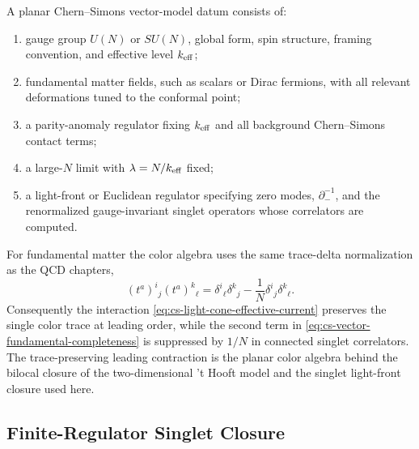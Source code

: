 \begin{definition}
\label{def:planar-cs-vector-model-datum}
A planar Chern--Simons vector-model datum consists of:
\begin{enumerate}[label=(\roman*)]
\item gauge group \(U(N)\) or \(SU(N)\), global form, spin structure, framing
  convention, and effective level \(k_{\rm eff}\);
\item fundamental matter fields, such as scalars or Dirac fermions, with all
  relevant deformations tuned to the conformal point;
\item a parity-anomaly regulator fixing \(k_{\rm eff}\) and all background
  Chern--Simons contact terms;
\item a large-\(N\) limit with \(\lambda=N/k_{\rm eff}\) fixed;
\item a light-front or Euclidean regulator specifying zero modes,
  \(\partial_-^{-1}\), and the renormalized gauge-invariant singlet
  operators whose correlators are computed.
\end{enumerate}
\end{definition}

For fundamental matter the color algebra uses the same trace-delta
normalization as the QCD chapters,
\begin{equation}
  (t^a)^i{}_j(t^a)^k{}_\ell
  =
  \delta^i{}_\ell\delta^k{}_j
  -
  \frac1N\delta^i{}_j\delta^k{}_\ell .
  \label{eq:cs-vector-fundamental-completeness}
\end{equation}
Consequently the interaction
\eqref{eq:cs-light-cone-effective-current} preserves the single color trace at
leading order, while the second term in
\eqref{eq:cs-vector-fundamental-completeness} is suppressed by \(1/N\) in
connected singlet correlators.  The trace-preserving leading contraction is the
planar color algebra behind the bilocal closure of the two-dimensional
't Hooft model and the singlet light-front closure used here.

\subsection{Finite-Regulator Singlet Closure}

